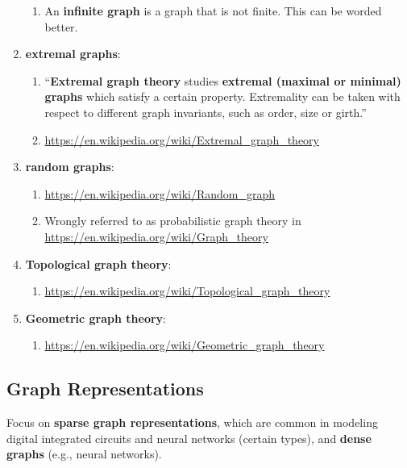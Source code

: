\begin{enumerate}
	\begin{enumerate} \itemsep -2pt
	\item An {\bf infinite graph} is a graph that is not finite. This can be worded better.
	\end{enumerate}
\item {\bf extremal graphs}: \vspace{-0.3cm}
	\begin{enumerate} \itemsep -2pt
	\item ``{\bf Extremal graph theory} studies {\bf extremal (maximal or minimal) graphs} which satisfy a certain property. Extremality can be taken with respect to different graph invariants, such as order, size or girth.''
	\item \url{https://en.wikipedia.org/wiki/Extremal_graph_theory}
	\end{enumerate}
\item {\bf random graphs}: \vspace{-0.3cm}
	\begin{enumerate} \itemsep -2pt
	\item \url{https://en.wikipedia.org/wiki/Random_graph}
	\item Wrongly referred to as probabilistic graph theory in \url{https://en.wikipedia.org/wiki/Graph_theory}
	\end{enumerate}
\item {\bf Topological graph theory}: \vspace{-0.3cm}
	\begin{enumerate} \itemsep -2pt
	\item \url{https://en.wikipedia.org/wiki/Topological_graph_theory}
	\end{enumerate}
\item {\bf Geometric graph theory}: \vspace{-0.3cm}
	\begin{enumerate} \itemsep -2pt
	\item \url{https://en.wikipedia.org/wiki/Geometric_graph_theory}
	\end{enumerate}
\end{enumerate}




\subsection{Graph Representations}
\label{ssec:GraphRepresentations}

Focus on {\bf sparse graph representations}, which are common in modeling digital integrated circuits and neural networks (certain types), and {\bf dense graphs} (e.g., neural networks). \\

